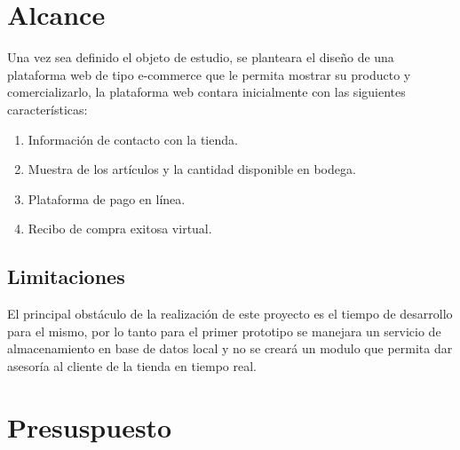 \section{Alcance}
Una vez sea definido el objeto de estudio, se planteara el diseño de una plataforma web de tipo e-commerce que le permita mostrar su producto y comercializarlo, la plataforma web contara inicialmente con las siguientes características:

\begin{enumerate}
	\item Información de contacto con la tienda.
	\item Muestra de los artículos y la cantidad disponible en bodega.
	\item Plataforma de pago en línea.
	\item Recibo de compra exitosa virtual.
\end{enumerate}

\subsection{Limitaciones}
El principal obstáculo de la realización de este proyecto es el tiempo de desarrollo para el mismo, por lo tanto para el primer prototipo se manejara un servicio de almacenamiento en base de datos local y no se creará un modulo que permita dar asesoría al cliente de la tienda en tiempo real.

\newpage

\section{Presuspuesto}


